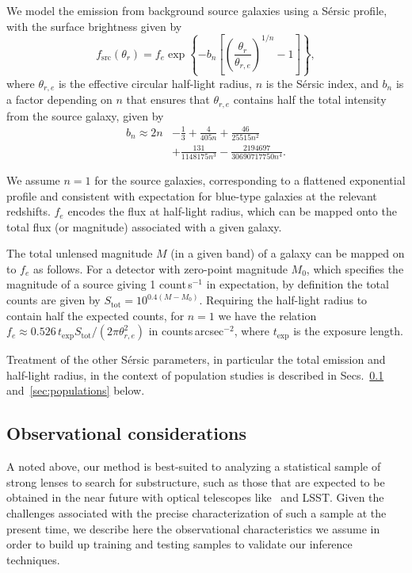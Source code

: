 \documentclass[twocolumn]{aastex62}
\begin{document}
We model the emission from background source galaxies using a S\'{e}rsic profile, with the surface brightness given by
\begin{equation}
f_\mathrm{src}(\theta_r)=f_{e} \exp \left\{-b_{n}\left[\left(\frac{\theta_r}{\theta_{r,e}}\right)^{1 / n}-1\right]\right\},
\end{equation}
where $\theta_{r,e}$ is the effective circular half-light radius, $n$ is the S\'{e}rsic index, and $b_n$ is a factor depending on $n$ that ensures that $\theta_{r,e}$ contains half the total intensity from the source galaxy, given by~\citep{1999A&A...352..447C}
\begin{align}
b_n \approx 2 n &- \frac{1}{3} + \frac{4}{405 n} + \frac{46}{25515 n^2} \nonumber \\ &+ \frac{131}{1148175 n^3} - \frac{2194697}{30690717750 n^4}. \nonumber
\end{align}

We assume $n=1$ for the source galaxies, corresponding to a flattened exponential profile and consistent with expectation for blue-type galaxies at the relevant redshifts. $f_{e}$ encodes the flux at half-light radius, which can be mapped onto the total flux (or magnitude) associated with a given galaxy.

The total unlensed magnitude $M$ (in a given band) of a galaxy can be mapped on to $f_{e}$ as follows. For a detector with zero-point magnitude $M_0$, which specifies the magnitude of a source giving 1 count\,s$^{-1}$ in expectation, by definition the total counts are given by $S_\mathrm{tot}=10^{0.4(M-M_0)}$. Requiring the half-light radius to contain half the expected counts, for $n=1$ we have the relation $f_{e} \approx 0.526\,t_\mathrm{exp}S_\mathrm{tot} /(2\pi \theta_{r,e}^2)$ in counts\,arcsec$^{-2}$, where $t_\mathrm{exp}$ is the exposure length.

Treatment of the other S\'{e}rsic parameters, in particular the total emission and half-light radius, in the context of population studies is described in Secs.~\ref{sec:observations} and~\ref{sec:populations} below.

\subsection{Observational considerations}
\label{sec:observations}

A noted above, our method is best-suited to analyzing a statistical sample of strong lenses to search for substructure, such as those that are expected to be obtained in the near future with optical telescopes like \Euclid~and LSST. Given the challenges associated with the precise characterization of such a sample at the present time, we describe here the observational characteristics we assume in order to build up training and testing samples to validate our inference techniques.
\end{document}
